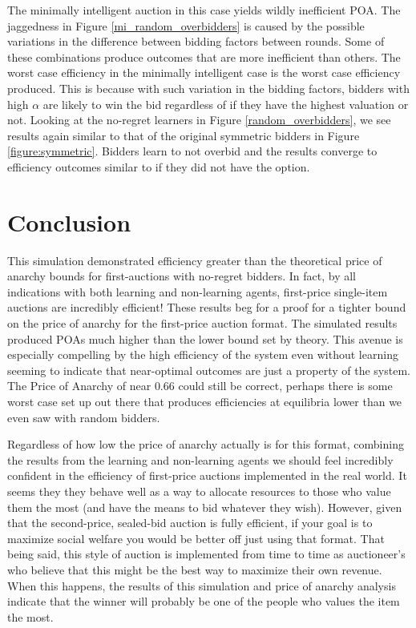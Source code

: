 \documentclass[12pt,twoside]{reedthesis}
\begin{document}
The minimally intelligent auction in this case yields wildly inefficient POA. The jaggedness in Figure \ref{mi_random_overbidders} is caused by the possible variations in the difference between bidding factors between rounds. Some of these combinations produce outcomes that are more inefficient than others. The worst case efficiency in the minimally intelligent case is the worst case efficiency produced. This is because with such variation in the bidding factors, bidders with high $\alpha$ are likely to win the bid regardless of if they have the highest valuation or not. Looking at the no-regret learners in Figure \ref{random_overbidders}, we see results again similar to that of the original symmetric bidders in Figure \ref{figure:symmetric}. Bidders learn to not overbid and the results converge to efficiency outcomes similar to if they did not have the option.



\chapter*{Conclusion}
	\setcounter{chapter}{4}
	\setcounter{section}{0}
	
This simulation demonstrated efficiency greater than the theoretical price of anarchy bounds for first-auctions with no-regret bidders. In fact, by all indications with both learning and non-learning agents, first-price single-item auctions are incredibly efficient! These results beg for a proof for a tighter bound on the price of anarchy for the first-price auction format. The simulated results produced POAs much higher than the lower bound set by theory. This avenue is especially compelling by the high efficiency of the system even without learning seeming to indicate that near-optimal outcomes are just a property of the system. The Price of Anarchy of near $0.66$ could still be correct, perhaps there is some worst case set up out there that produces efficiencies at equilibria lower than we even saw with random bidders. 

Regardless of how low the price of anarchy actually is for this format, combining the results from the learning and non-learning agents we should feel incredibly confident in the efficiency of first-price auctions implemented in the real world. It seems they they behave well as a way to allocate resources to those who value them the most (and have the means to bid whatever they wish). However, given that the second-price, sealed-bid auction is fully efficient, if your goal is to maximize social welfare you would be better off just using that format. That being said, this style of auction is implemented from time to time as auctioneer's who believe that this might be the best way to maximize their own revenue. When this happens, the results of this simulation and price of anarchy analysis indicate that the winner will probably be one of the people who values the item the most. 
\end{document}
